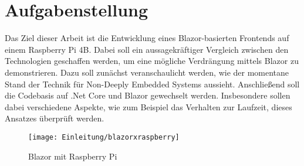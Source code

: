 \section{Aufgabenstellung}
\label{sec:aufgabenstellung}
Das Ziel dieser Arbeit ist die Entwicklung eines Blazor-basierten Frontends auf einem Raspberry Pi
4B. Dabei soll ein aussagekräftiger Vergleich zwischen den Technologien geschaffen werden, um
eine mögliche Verdrängung mittels Blazor zu demonstrieren.
Dazu soll zunächst veranschaulicht werden, wie der momentane Stand der Technik für Non-Deeply
Embedded Systems aussieht. Anschließend soll die Codebasis auf .Net Core und Blazor
gewechselt werden.
Insbesondere sollen dabei verschiedene Aspekte, wie zum Beispiel das Verhalten zur Laufzeit,
dieses Ansatzes überprüft werden.
\begin{figure}[h]
    \centering
    \texttt{[image: Einleitung/blazorxraspberry]}
    \caption[Blazor mit Raspberry Pi]{Blazor mit Raspberry Pi}
    \label{img:blazorxraspberry}
\end{figure}